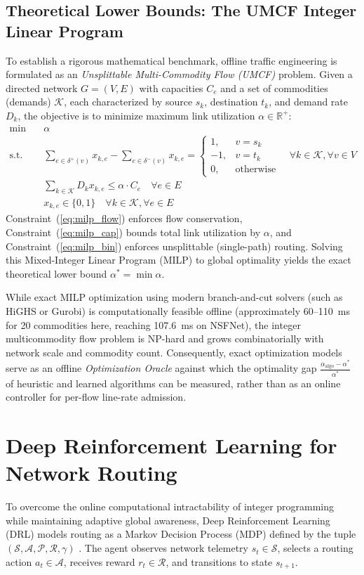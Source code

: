 \documentclass[12pt,a4paper,oneside]{report}
\begin{document}
\subsection{Theoretical Lower Bounds: The UMCF Integer Linear Program}
To establish a rigorous mathematical benchmark, offline traffic engineering is formulated as an \emph{Unsplittable Multi-Commodity Flow (UMCF)} problem. Given a directed network $G=(V, E)$ with capacities $C_e$ and a set of commodities (demands) $\mathcal{K}$, each characterized by source $s_k$, destination $t_k$, and demand rate $D_k$, the objective is to minimize maximum link utilization $\alpha \in \mathbb{R}^+$:
\begin{align}
\min \quad & \alpha \label{eq:milp_obj} \\
\text{s.t.} \quad & \sum_{e \in \delta^+(v)} x_{k,e} - \sum_{e \in \delta^-(v)} x_{k,e} = \begin{cases} 
1, & v = s_k \\ 
-1, & v = t_k \\ 
0, & \text{otherwise} 
\end{cases} \quad \forall k \in \mathcal{K}, \forall v \in V \label{eq:milp_flow} \\
& \sum_{k \in \mathcal{K}} D_k x_{k,e} \le \alpha \cdot C_e \quad \forall e \in E \label{eq:milp_cap} \\
& x_{k,e} \in \{0, 1\} \quad \forall k \in \mathcal{K}, \forall e \in E \label{eq:milp_bin}
\end{align}
Constraint~(\ref{eq:milp_flow}) enforces flow conservation, Constraint~(\ref{eq:milp_cap}) bounds total link utilization by $\alpha$, and Constraint~(\ref{eq:milp_bin}) enforces unsplittable (single-path) routing. Solving this Mixed-Integer Linear Program (MILP) to global optimality yields the exact theoretical lower bound $\alpha^* = \min \alpha$. 

While exact MILP optimization using modern branch-and-cut solvers (such as HiGHS or Gurobi) is computationally feasible offline (approximately 60--110~ms for 20 commodities here, reaching 107.6~ms on NSFNet), the integer multicommodity flow problem is NP-hard and grows combinatorially with network scale and commodity count. Consequently, exact optimization models serve as an offline \emph{Optimization Oracle} against which the optimality gap $\frac{\alpha_{\mathrm{algo}} - \alpha^*}{\alpha^*}$ of heuristic and learned algorithms can be measured, rather than as an online controller for per-flow line-rate admission.

\section{Deep Reinforcement Learning for Network Routing}
\label{sec:lit_drl}
To overcome the online computational intractability of integer programming while maintaining adaptive global awareness, Deep Reinforcement Learning (DRL) models routing as a Markov Decision Process (MDP) defined by the tuple $(\mathcal{S}, \mathcal{A}, \mathcal{P}, \mathcal{R}, \gamma)$ \cite{sutton2018rl}. The agent observes network telemetry $s_t \in \mathcal{S}$, selects a routing action $a_t \in \mathcal{A}$, receives reward $r_t \in \mathcal{R}$, and transitions to state $s_{t+1}$.
\end{document}
